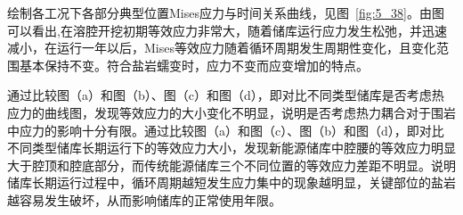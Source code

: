 绘制各工况下各部分典型位置Mises应力与时间关系曲线，见图~\ref{fig:5_38}。由图可以看出,在溶腔开挖初期等效应力非常大，随着储库运行应力发生松弛，并迅速减小，在运行一年以后，Mises等效应力随着循环周期发生周期性变化，且变化范围基本保持不变。符合盐岩蠕变时，应力不变而应变增加的特点。

通过比较图（a）和图（b）、图（c）和图（d），即对比不同类型储库是否考虑热应力的曲线图，发现等效应力的大小变化不明显，说明是否考虑热力耦合对于围岩中应力的影响十分有限。通过比较图（a）和图（c）、图（b）和图（d），即对比不同类型储库长期运行下的等效应力大小，发现新能源储库中腔腰的等效应力明显大于腔顶和腔底部分，而传统能源储库三个不同位置的等效应力差距不明显。说明储库长期运行过程中，循环周期越短发生应力集中的现象越明显，关键部位的盐岩越容易发生破坏，从而影响储库的正常使用年限。

\begin{figure}[p]
    \centering
\end{figure}
